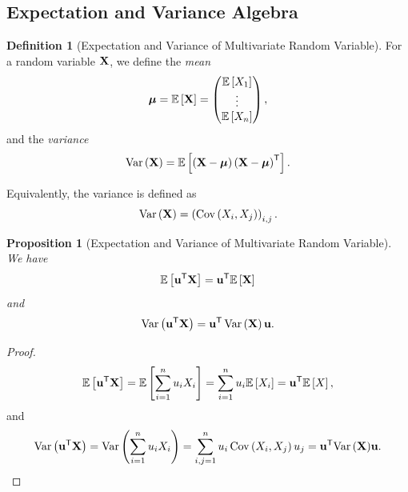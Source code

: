\documentclass{article}
\newtheorem{proposition}[theorem]{Proposition}
\theoremstyle{definition}
\newtheorem{definition}[theorem]{Definition}
\theoremstyle{remark}
\newcommand{\Expt}{\mathbb{E}}
\newcommand{\transpose}{^{\mathsf{T}}}
\newcommand{\pmqty}[1]{\begin{pmatrix}#1\end{pmatrix}}
\newcommand{\Var}{\operatorname{Var}}
\newcommand{\Cov}{\operatorname{Cov}}
\begin{document}
\subsection{Expectation and Variance Algebra}

\begin{definition}[Expectation and Variance of Multivariate Random Variable]
    \label{def:expt-var-multivariate}%
    For a random variable \(\vb{X}\), we define the \emph{mean}
    \[
        \vb*{\mu} = \Expt\bqty{\vb{X}} = \pmqty{\Expt\bqty{X_1} \\ \vdots \\ \Expt\bqty{X_n}},
    \]
    and the \emph{variance}
    \[
        \Var\pqty{\vb{X}} = \Expt\bqty{\pqty{\vb{X} - \vb*{\mu}} \pqty{\vb{X} - \vb*{\mu}}\transpose}.
    \]

    Equivalently, the variance is defined as
    \[
        \Var\pqty{\vb{X}} = \pqty{\Cov\pqty{X_i, X_j}}_{i, j}.
    \]
\end{definition}

\begin{proposition}[Expectation and Variance of Multivariate Random Variable]
    \label{prop:expt-var-transform-multivariate-rv}%
    We have
    \[
        \Expt\bqty{\vb{u} \transpose \vb{X}} = \vb{u}\transpose \Expt\bqty{\vb{X}}
    \]
    and
    \[
        \Var\pqty{\vb{u} \transpose \vb{X}} = \vb{u}\transpose \Var\pqty{\vb{X}} \vb{u}.
    \]
\end{proposition}

\begin{proof}
    \[
        \Expt\bqty{\vb{u} \transpose \vb{X}} = \Expt\bqty{\sum_{i = 1}^{n} u_i X_i} = \sum_{i = 1}^{n} u_i \Expt\bqty{X_i} = \vb{u}\transpose \Expt\bqty{X},
    \]
    and
    \[
        \Var\pqty{\vb{u} \transpose \vb{X}} = \Var\pqty{\sum_{i = 1}^{n} u_i X_i} = \sum_{i, j = 1}^{n} u_i \Cov\pqty{X_i, X_j} u_j = \vb{u}\transpose \vb{\Var\pqty{\vb{X}}} \vb{u}. 
    \]
\end{proof}
\end{document}
